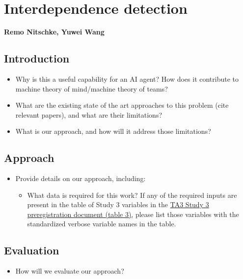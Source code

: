 \chapter{Interdependence detection}
\textbf{Remo Nitschke, Yuwei Wang}
\section{Introduction}
\begin{itemize}
    \item Why is this a useful capability for an AI
        agent? How does it contribute to machine theory of mind/machine theory
        of teams?
    \item What are the existing state of the art approaches to this problem
        (cite relevant papers), and what are their limitations? 
    \item What is our approach, and how will it address those limitations?
\end{itemize}

\section{Approach}
\begin{itemize}
    \item Provide details on our approach, including:
        \begin{itemize}
            \item What data is required for this work? If any of the required
                inputs are present in the table of Study 3 variables in the
                \href{https://docs.google.com/document/d/1GF7VsNF9R95IAaj6mVZUDV2mAX5ok1Bh6Tcm8zDpIkg/edit#heading=h.1ksv4uv}{TA3
                Study 3 preregistration document (table 3)}, please list those
                variables with the standardized verbose variable names in the table.
        \end{itemize}
\end{itemize}

\section{Evaluation}
\begin{itemize}
    \item How will we evaluate our approach?
\end{itemize}

